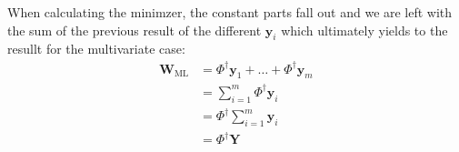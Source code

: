 When calculating the minimzer, the constant parts fall out and we are left with the sum of the previous result of the different $\mathbf{y}_i$ which ultimately yields to the resullt for the multivariate case:
\begin{align*}
  \mathbf{W}_\text{ML} &= \Phi^\dagger \mathbf{y}_1 + \ldots + \Phi^\dagger \mathbf{y}_m \\
  &= \sum_{i=1}^m \Phi^\dagger \mathbf{y}_i \\
  &= \Phi^\dagger \sum_{i=1}^m \mathbf{y}_i \\
  &= \Phi^\dagger \mathbf{Y}
\end{align*}
%
%
%
%
%
%

%



